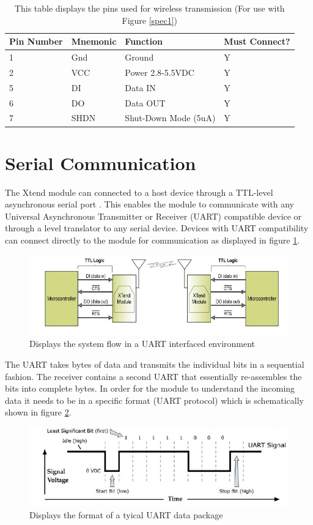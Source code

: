 \documentclass[paper=a4, fontsize=11pt]{scrartcl}
\numberwithin{equation}{section}		%
\numberwithin{figure}{section}			%
\numberwithin{table}{section}				%
\begin{document}
\begin{table}[H]
\begin{tabularx}{\textwidth}{ |X|X|X|X| }
\hline
Pin Number & Mnemonic & Function & Must Connect? \\ 
\hline
1 & Gnd & Ground & Y \\
\hline
2 & VCC & Power 2.8-5.5VDC & Y\\
\hline
5 & DI & Data IN & Y \\
\hline
6 & DO & Data OUT & Y \\
\hline
7 & SHDN & Shut-Down Mode (5uA) & Y \\
\hline
\end{tabularx}
\caption{This table displays the pins used for wireless transmission (For use with Figure \ref{spec1}) }
\label{spec2}
\end{table}





\section{Serial Communication}
The Xtend module can connected to a host device through a TTL-level asynchronous serial port \cite{man}. This enables the module to communicate with any Universal Asynchronous Transmitter or Receiver (UART) compatible device or through a level translator to any serial device. Devices with UART compatibility can connect directly to the module for communication as displayed in figure \ref{uartf}. 

\begin{figure}[h!]
\centering
\includegraphics[width=0.8\linewidth]{uartf}
\caption{ Displays the system flow in a UART interfaced environment \cite{man}}
\label{uartf}
\end{figure}

The UART takes bytes of data and transmits the individual bits in a sequential fashion. The receiver contains a second UART that essentially re-assembles the bits into complete bytes. In order for the module to understand the incoming data it needs to be in a specific format (UART protocol) which is schematically shown in figure \ref{uartb}.
\begin{figure}[h!]
\centering
\includegraphics[width=0.8\linewidth]{uartb}
\caption{ Displays the format of a tyical UART data package \cite{man}}
\label{uartb}
\end{figure}
\end{document}
